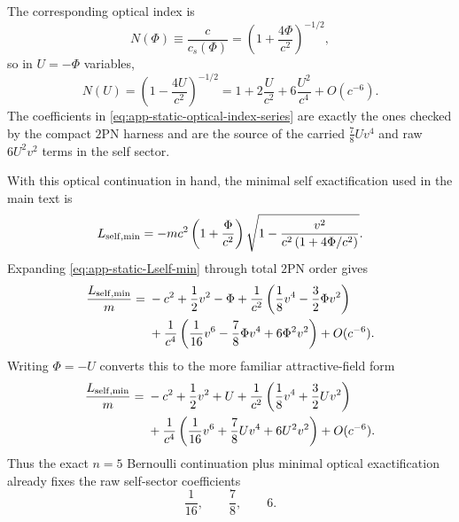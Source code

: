 \documentclass[11pt]{article}
\newcommand{\TwoPN}{\mathrm{2PN}}
\begin{document}
The corresponding optical index is
\begin{equation}
N(\Phi)\equiv \frac{c}{c_s(\Phi)}=
\left(1+\frac{4\Phi}{c^2}\right)^{-1/2},
\label{eq:app-static-optical-index}
\end{equation}
so in \(U=-\Phi\) variables,
\begin{equation}
N(U)=\left(1-\frac{4U}{c^2}\right)^{-1/2}
=1+2\frac{U}{c^2}+6\frac{U^2}{c^4}+O(c^{-6}).
\label{eq:app-static-optical-index-series}
\end{equation}
The coefficients in \cref{eq:app-static-optical-index-series} are exactly the ones checked
by the compact \(\TwoPN\) harness and are the source of the carried
\(\frac{7}{8}Uv^4\) and raw \(6U^2v^2\) terms in the self sector.

With this optical continuation in hand, the minimal self exactification used in the main
text is
\begin{equation}
L_{\rm self,min}
=-mc^2\left(1+\frac{\Phi}{c^2}\right)
\sqrt{1-\frac{v^2}{c^2\left(1+4\Phi/c^2\right)}}.
\label{eq:app-static-Lself-min}
\end{equation}
Expanding \cref{eq:app-static-Lself-min} through total \(\TwoPN\) order gives
\begin{align}
\frac{L_{\rm self,min}}{m}
={}&-c^2+\frac12v^2-\Phi
+\frac{1}{c^2}\left(\frac18v^4-\frac32\Phi v^2\right)
\nonumber\\
&+\frac{1}{c^4}\left(\frac1{16}v^6-\frac78\Phi v^4+6\Phi^2v^2\right)
+O(c^{-6}).
\label{eq:app-static-Lself-min-phi}
\end{align}
Writing \(\Phi=-U\) converts this to the more familiar attractive-field form
\begin{align}
\frac{L_{\rm self,min}}{m}
={}&-c^2+\frac12v^2+U
+\frac{1}{c^2}\left(\frac18v^4+\frac32Uv^2\right)
\nonumber\\
&+\frac{1}{c^4}\left(\frac1{16}v^6+\frac78Uv^4+6U^2v^2\right)
+O(c^{-6}).
\label{eq:app-static-Lself-min-U}
\end{align}
Thus the exact \(n=5\) Bernoulli continuation plus minimal optical exactification already
fixes the raw self-sector coefficients
\begin{equation}
\frac1{16},\qquad \frac78,\qquad 6.
\label{eq:app-static-self-coeffs}
\end{equation}
\end{document}
